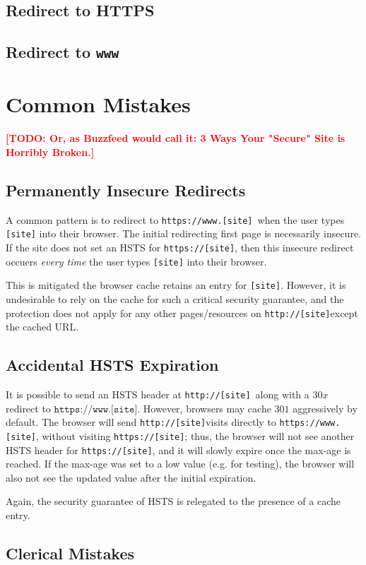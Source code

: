 \documentclass[conference]{./IEEEtran}
\newcommand{\todo}[1]{\textcolor{red}{\textbf{[TODO: #1]}}}
\newcommand{\site}[1]{\texttt{#1}}
\newcommand{\code}[1]{\texttt{#1}}
\newcommand{\genericsite}{[site]}
\newcommand{\h}{{\site{http://\genericsite}}}
\newcommand{\s}{{\site{https://\genericsite}}}
\newcommand{\sw}{{\site{https://www.\genericsite}}}
\theoremstyle{plain}
\begin{document}
\subsection{Redirect to HTTPS}

\subsection{Redirect to \code{www}}

\section{Common Mistakes}
\todo{Or, as Buzzfeed would call it: 3 Ways Your "Secure" Site is Horribly Broken.}

\subsection{Permanently Insecure Redirects}

A common pattern is to redirect to \sw~when the user types \site{\genericsite} into their browser. The initial redirecting first page is necessarily insecure. If the site does not set an HSTS for \s, then this insecure redirect occuers \emph{every time} the user types \site{\genericsite} into their browser.

This is mitigated the browser cache retains an entry for \site{\genericsite}. However, it is undesirable to rely on the cache for such a critical security guarantee, and the protection does not apply for any other pages/resources on \h except the cached URL.

\subsection{Accidental HSTS Expiration}

It is possible to send an HSTS header at \h~along with a $30x$ redirect to $\sw$. However, browsers may cache $301$ aggressively by default. The browser will send \h visits directly to \sw, without visiting \s; thus, the browser will not see another HSTS header for \s, and it will slowly expire once the max-age is reached. If the max-age was set to a low value (e.g. for testing), the browser will also not see the updated value after the initial expiration.

Again, the security guarantee of HSTS is relegated to the presence of a cache entry.

\subsection{Clerical Mistakes}
\end{document}
